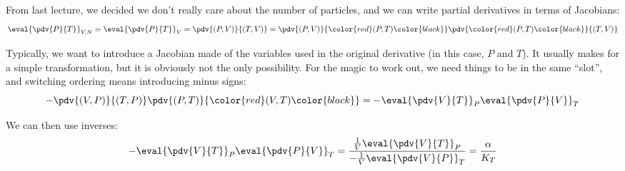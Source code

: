 \documentclass[a4paper,twoside,master.tex]{subfiles}
\begin{document}

From last lecture, we decided we don't really care about the number of particles, and we can write partial derivatives in terms of Jacobians:
\begin{equation}
    \eval{\pdv{P}{T}}_{V,N} \equiv \eval{\pdv{P}{T}}_{V} = \pdv{(P,V)}{(T,V)} = \pdv{(P,V)}{\color{red}(P,T)\color{black}} \pdv{\color{red}(P,T)\color{black}}{(T,V)}
\end{equation}

Typically, we want to introduce a Jacobian made of the variables used in the original derivative (in this case, $ P $ and $ T $). It usually makes for a simple transformation, but it is obviously not the only possibility. For the magic to work out, we need things to be in the same ``slot'', and switching ordering means introducing minus signs:
\begin{equation}
    - \pdv{(V,P)}{(T,P)} \pdv{(P,T)}{\color{red}(V,T)\color{black}} = - \eval{\pdv{V}{T}}_{P} \eval{\pdv{P}{V}}_{T}
\end{equation}

We can then use inverses:
\begin{equation}
    - \eval{\pdv{V}{T}}_{P} \eval{\pdv{P}{V}}_{T} = \frac{\frac{1}{V} \eval{\pdv{V}{T}}_{P}}{- \frac{1}{V} \eval{\pdv{V}{P}}_{T}} = \frac{\alpha}{K_T}
\end{equation}
\end{document}
